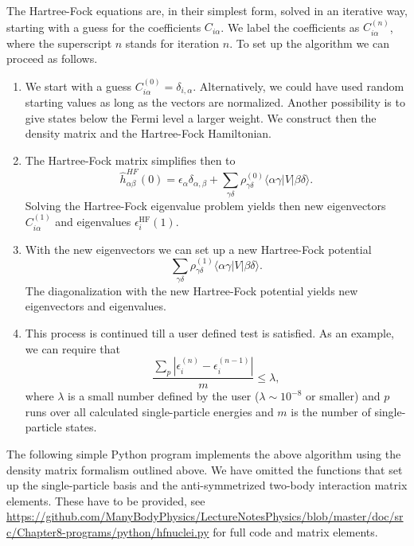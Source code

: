 The Hartree-Fock equations are, in their simplest form, solved in an
iterative way, starting with a guess for the coefficients
$C_{i\alpha}$. We label the coefficients as $C_{i\alpha}^{(n)}$, where
the superscript $n$ stands for iteration $n$.  To set up the algorithm
we can proceed as follows.

\begin{svgraybox}
\begin{enumerate}
\item We start with a guess
  $C_{i\alpha}^{(0)}=\delta_{i,\alpha}$. Alternatively, we could have
  used random starting values as long as the vectors are
  normalized. Another possibility is to give states below the Fermi
  level a larger weight. We construct then the density matrix and the 
Hartree-Fock Hamiltonian. 
\item The Hartree-Fock matrix simplifies then to
\[
\hat{h}_{\alpha\beta}^{HF}(0)=\epsilon_{\alpha}\delta_{\alpha,\beta}+
\sum_{\gamma\delta} \rho_{\gamma\delta}^{(0)}\langle \alpha\gamma|V|\beta\delta\rangle.
\]
Solving the Hartree-Fock eigenvalue problem yields then new eigenvectors $C_{i\alpha}^{(1)}$ and eigenvalues
$\epsilon_i^{\mathrm{HF}}(1)$. 
\item With the new eigenvectors we can set up a new Hartree-Fock potential 
\[
\sum_{\gamma\delta} \rho_{\gamma\delta}^{(1)}\langle \alpha\gamma|V|\beta\delta\rangle.
\]
The diagonalization with the new Hartree-Fock potential yields new eigenvectors and eigenvalues.
\item This process is continued till a user defined test is
  satisfied. As an example, we can require that
\[
\frac{\sum_{p} |\epsilon_i^{(n)}-\epsilon_i^{(n-1)}|}{m} \le \lambda,
\]
where $\lambda$ is a small number defined by the user ($\lambda \sim
10^{-8}$ or smaller) and $p$ runs over all calculated single-particle
energies and $m$ is the number of single-particle states.

\end{enumerate}
\end{svgraybox}
The following simple Python program implements the above algorithm using the density matrix formalism outlined above.
We have omitted the functions that set up the single-particle basis and the anti-symmetrized two-body interaction matrix elements.
These have to be provided, see \url{https://github.com/ManyBodyPhysics/LectureNotesPhysics/blob/master/doc/src/Chapter8-programs/python/hfnuclei.py}
for full code and matrix elements.

